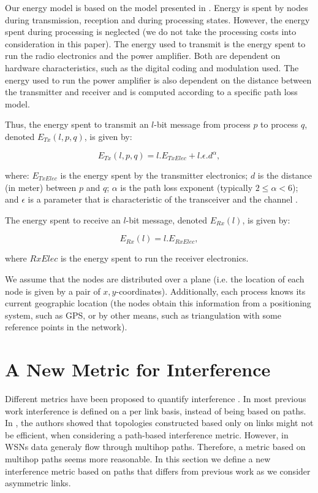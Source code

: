 \documentclass{llncs}
\begin{document}
Our energy model is based on the model presented in \cite{Heinzelman2002}. Energy is spent
by nodes during transmission, reception and during processing states. However, the energy spent 
during processing is neglected (we do not take the processing costs into consideration in this paper). The energy used to transmit is the energy spent to run the radio electronics
and the power amplifier. Both are dependent on hardware characteristics, such as the digital coding and 
modulation used. The energy used to run the power amplifier is also dependent on the distance 
between the transmitter and receiver and is computed according to a specific path loss model. 

Thus, the energy spent to transmit an $l$-bit message from process $p$ to process $q$, denoted 
$E_{Tx}(l, p, q)$, is given by:

\begin{equation}\label{eq-etx}
E_{Tx}(l, p, q) = l.E_{TxElec} + l.\epsilon.d^\alpha,
\end{equation}

where: $E_{TxElec}$ is the energy spent by the transmitter electronics; $d$ is the distance (in meter)
between $p$ and $q$; $\alpha$ is the path loss exponent (typically $2 \le \alpha < 6$); and $\epsilon$  is 
a parameter that is characteristic of the transceiver and the channel \cite{Rappaport1996}. 

The energy spent to receive an $l$-bit message, denoted $E_{Rx}(l)$, is given by:

\begin{equation}\label{eq-erx}
E_{Rx}(l) = l.E_{RxElec},
\end{equation}

where $RxElec$ is the energy spent to run the receiver electronics.

We assume that the nodes are distributed over a plane (i.e. the location
of each node is given by a pair of $x,y$-coordinates). Additionally, each process knows its current geographic location
(the nodes obtain this information from a positioning system, such as GPS, or by
other means, such as triangulation with some reference points in the network).

\section{A New Metric for Interference}
\label{sec-interference}

Different metrics have been proposed to quantify interference \cite{blough2005} \cite{Li05} \cite{burkhart2004} \cite{johansson2005} \cite{Moaveni-nejad05}. 
In most previous work interference is defined on a per link basis, instead of being based on paths. In \cite{blough2005}, the authors showed that topologies constructed based only on
links might not be efficient, when considering a path-based interference metric. However, in WSNs data generaly flow through multihop paths. Therefore, a metric based on multihop
paths seems more reasonable. In this section we define a new interference metric based on paths that differs from previous work as we consider asymmetric links.
\end{document}
